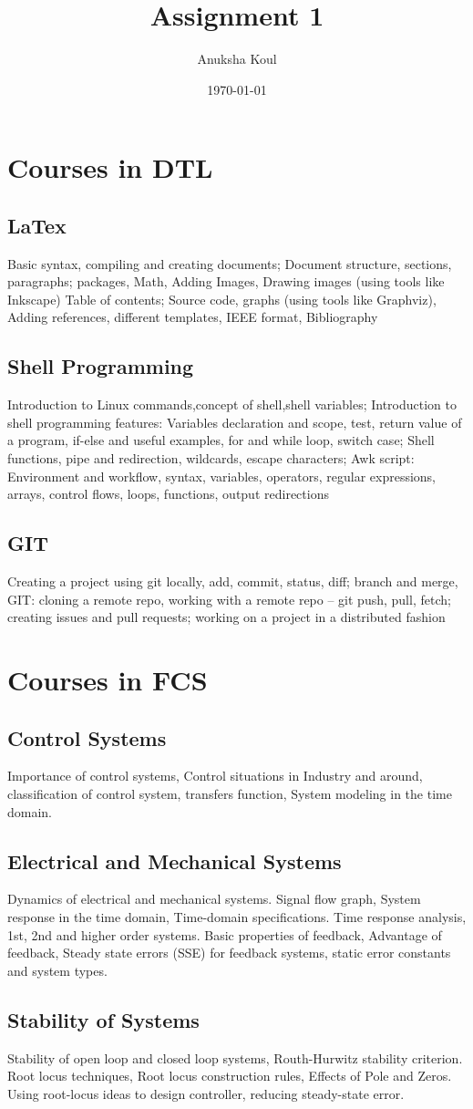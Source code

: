\documentclass[12pt]{article}
\title{Assignment 1}
\author{Anuksha Koul}
\date{\today}
\begin{document}
\maketitle
\newpage
{}
\section{Courses in DTL}
\subsection{LaTex}
Basic syntax, compiling and creating documents; Document structure, sections,
paragraphs; packages, Math, Adding Images, Drawing images (using tools like Inkscape) Table
of contents; Source code, graphs (using tools like Graphviz), Adding references, different
templates, IEEE format, Bibliography
\subsection{Shell Programming}
Introduction to Linux commands,concept of shell,shell variables; Introduction to shell programming features: Variables declaration and scope,
test, return value of a program, if-else and useful examples, for and while loop, switch case;
Shell functions, pipe and redirection, wildcards, escape characters; Awk script: Environment and
workflow, syntax, variables, operators, regular expressions, arrays, control flows, loops,
functions, output redirections
\subsection{GIT}
Creating a project using git locally, add, commit, status, diff; branch and merge, GIT:
cloning a remote repo, working with a remote repo – git push, pull, fetch; creating issues and pull
requests; working on a project in a distributed fashion\\
\pagebreak
\section{Courses in FCS}
\subsection{Control Systems}
Importance of control systems, Control situations in Industry and around, classification
of control system, transfers function, System modeling in the time domain. 
\subsection{Electrical and Mechanical Systems}
Dynamics of electrical and mechanical systems. Signal flow graph, System response in
the time domain, Time-domain specifications. Time response analysis, 1st, 2nd and higher order
systems. Basic properties of feedback, Advantage of feedback, Steady state errors (SSE) for
feedback systems, static error constants and system types.
\subsection{Stability of Systems}
Stability of open loop and closed loop systems, Routh-Hurwitz stability criterion. Root
locus techniques, Root locus construction rules, Effects of Pole and Zeros. Using root-locus ideas
to design controller, reducing steady-state error.
\end{document}
